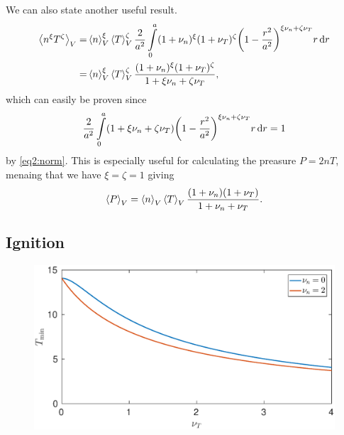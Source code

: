 \documentclass[11pt,a4paper, 
swedish, english %
]{article}
\begin{document}
We can also state another useful result.
\begin{equation}
\begin{aligned}
\ev{n^\xi T^\zeta}_V=&\ev{n}_V^\xi\ev{T}_V^\zeta
\frac{2}{a^2}\int_0^a(1+\nu_n)^\xi(1+\nu_T)^\zeta
\qty(1-\frac{r^2}{a^2})^{\xi\nu_n+\zeta\nu_T}r\id{r}\\
=&\ev{n}_V^\xi\ev{T}_V^\zeta
\frac{(1+\nu_n)^\xi(1+\nu_T)^\zeta}{1+\xi\nu_n+\zeta\nu_T},
\end{aligned}
\end{equation}
which can easily be proven since
\begin{equation}
\frac{2}{a^2}\int_0^a(1+\xi\nu_n+\zeta\nu_T)
\qty(1-\frac{r^2}{a^2})^{\xi\nu_n+\zeta\nu_T}r\id{r}
=1
\end{equation}
by \eqref{eq2:norm}.
This is especially useful for calculating the preasure $P=2nT$,
menaing that we have $\xi=\zeta=1$ giving
\begin{equation}
\ev{P}_V=\ev{n}_V\ev{T}_V
\frac{(1+\nu_n)(1+\nu_T)}{1+\nu_n+\nu_T}.
\end{equation}


\subsection*{Ignition}


\begin{figure}
\centering
\includegraphics[width=14cm]{T_min.eps}
\caption{}
\label{fig:T_min}
\end{figure}




\end{document}
